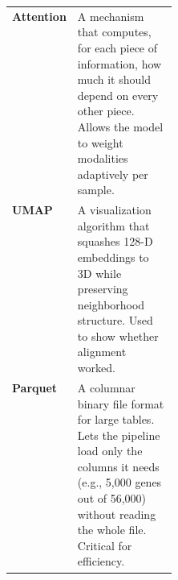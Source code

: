 \documentclass[11pt]{article}
\begin{document}
\begin{tcolorbox}[CSbox]
\begin{tabularx}{\linewidth}{>{\raggedright\arraybackslash\bfseries}p{0.24\linewidth}>{\raggedright\arraybackslash}X}
Attention &
A mechanism that computes, for each piece of information, how much it should depend on every other piece. Allows the model to weight modalities adaptively per sample. \\

UMAP &
A visualization algorithm that squashes 128-D embeddings to 3D while preserving neighborhood structure. Used to show whether alignment worked. \\

Parquet &
A columnar binary file format for large tables. Lets the pipeline load only the columns it needs (e.g., 5,000 genes out of 56,000) without reading the whole file. Critical for efficiency. \\

\bottomrule
\end{tabularx}
\end{tcolorbox}

\vspace{4pt}
\end{document}
